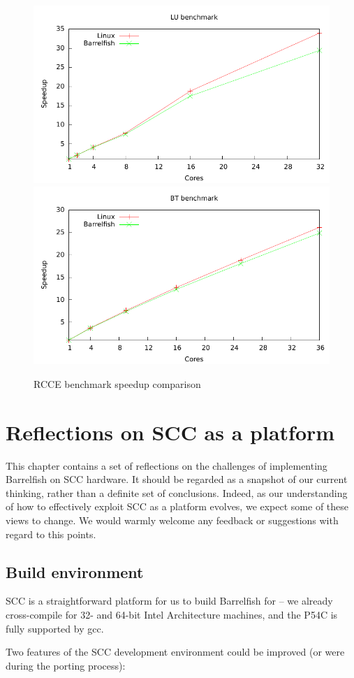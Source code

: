\documentclass[a4paper,twoside]{report} %
\begin{document}
\begin{figure}
  \centering
  \includegraphics[width=.5\textwidth]{plots/rcce_bench/rcce_lu_speedup.pdf}%
  \includegraphics[width=.5\textwidth]{plots/rcce_bench/rcce_bt_speedup.pdf}
  \caption{RCCE benchmark speedup comparison}
  \label{fig:appresults_speedup}
\end{figure}

\chapter{Reflections on SCC as a platform}\label{chap:refl}

This chapter contains a set of reflections on the challenges of
implementing Barrelfish on SCC hardware.  It should be regarded as a
snapshot of our current thinking, rather than a definite set of
conclusions.  Indeed, as our understanding of how to effectively
exploit SCC as a platform evolves, we expect some of these views to
change.  We would warmly welcome any feedback or suggestions with
regard to this points.  

\section{Build environment}

SCC is a straightforward platform for us to build Barrelfish for -- we
already cross-compile for 32- and 64-bit Intel Architecture machines,
and the P54C is fully supported by gcc. 

Two features of the SCC development environment could be improved (or
were during the porting process): 
\end{document}
